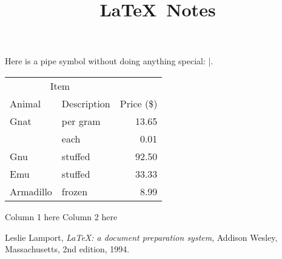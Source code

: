 \documentclass{article}
\title{\LaTeX~Notes}
\author{}
\date{}
\begin{document}
\maketitle

\tableofcontents

Here is a pipe symbol without doing anything special: |.

\begin{tabular}{llr}
  \toprule
  \multicolumn{2}{c}{Item} \\
  \cmidrule(r){1-2} %
    Animal    & Description & Price (\$) \\
    \midrule
    Gnat      & per gram    & 13.65      \\
              & each        & 0.01       \\
    Gnu       & stuffed     & 92.50      \\
    Emu       & stuffed     & 33.33      \\
    Armadillo & frozen      & 8.99       \\
  \bottomrule
\end{tabular}






\begin{multicols}{2}
  Column 1 here
  \columnbreak
  Column 2 here
\end{multicols}


\begin{thebibliography}{9}
%  

    Leslie Lamport,
    \emph{\LaTeX\@: a document preparation system},
    Addison Wesley, Massachusetts,
    2nd edition,
    1994.

\end{thebibliography}
\end{document}
